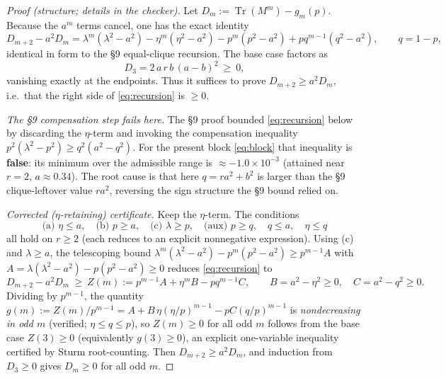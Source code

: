 \documentclass[11pt]{article}
\theoremstyle{remark}
\newcommand{\Tr}{\operatorname{Tr}}
\begin{document}
\begin{proof}[Proof (structure; details in the checker)]
Let $D_m:=\Tr(M^m)-g_m(p)$.  Because the $a^m$ terms cancel, one has the exact identity
\begin{equation}\label{eq:recursion}
        D_{m+2}-a^2D_m=\lambda^m(\lambda^2-a^2)-\eta^m(\eta^2-a^2)-p^m(p^2-a^2)+pq^{m-1}(q^2-a^2),
        \qquad q=1-p,
\end{equation}
identical in form to the \S9 equal-clique recursion.  The base case factors as
\[
        D_3=2\,a\,r\,b\,(a-b)^2\ \ge\ 0,
\]
vanishing exactly at the endpoints.  Thus it suffices to prove $D_{m+2}\ge a^2D_m$, i.e.\ that the right side of \eqref{eq:recursion} is $\ge0$.

\emph{The \S9 compensation step fails here.}  The \S9 proof bounded \eqref{eq:recursion} below by discarding the $\eta$-term and invoking the compensation inequality $p^2(\lambda^2-p^2)\ge q^2(a^2-q^2)$.  For the present block \eqref{eq:block} that inequality is \textbf{false}: its minimum over the admissible range is $\approx-1.0\times10^{-3}$ (attained near $r=2$, $a\approx0.34$).  The root cause is that here $q=ra^2+b^2$ is larger than the \S9 clique-leftover value $ra^2$, reversing the sign structure the \S9 bound relied on.

\emph{Corrected ($\eta$-retaining) certificate.}  Keep the $\eta$-term.  The conditions
\[
        \text{(a) }\eta\le a,\quad\text{(b) }p\ge a,\quad\text{(c) }\lambda\ge p,\quad\text{(aux) }p\ge q,\quad q\le a,\quad \eta\le q
\]
all hold on $r\ge2$ (each reduces to an explicit nonnegative expression).  Using (c) and $\lambda\ge a$, the telescoping bound $\lambda^m(\lambda^2-a^2)-p^m(p^2-a^2)\ge p^{m-1}A$ with $A=\lambda(\lambda^2-a^2)-p(p^2-a^2)\ge0$ reduces \eqref{eq:recursion} to
\[
        D_{m+2}-a^2D_m\ \ge\ Z(m):=p^{m-1}A+\eta^mB-pq^{m-1}C,
        \qquad B=a^2-\eta^2\ge0,\quad C=a^2-q^2\ge0.
\]
Dividing by $p^{m-1}$, the quantity $g(m):=Z(m)/p^{m-1}=A+B\,\eta(\eta/p)^{m-1}-pC(q/p)^{m-1}$ is \emph{nondecreasing in odd $m$} (verified; $\eta\le q\le p$), so $Z(m)\ge0$ for all odd $m$ follows from the base case $Z(3)\ge0$ (equivalently $g(3)\ge0$), an explicit one-variable inequality certified by Sturm root-counting.  Then $D_{m+2}\ge a^2D_m$, and induction from $D_3\ge0$ gives $D_m\ge0$ for all odd $m$.
\end{proof}
\end{document}
